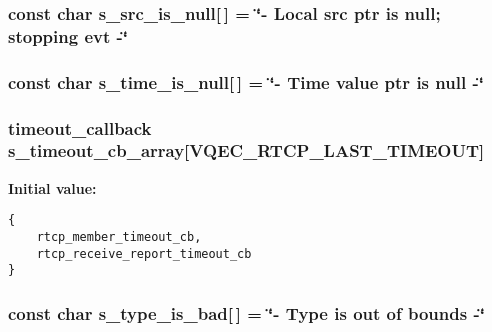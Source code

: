 \subsubsection{\setlength{\rightskip}{0pt plus 5cm}const char \bf{s\_\-src\_\-is\_\-null}[$\,$] = \char`\"{}- Local src ptr is null; stopping evt -\char`\"{}\hspace{0.3cm}{\tt  [static]}}\label{vqec__rtp_8c_ef2ddefa7c16210b376e11f459d68983}


\subsubsection{\setlength{\rightskip}{0pt plus 5cm}const char \bf{s\_\-time\_\-is\_\-null}[$\,$] = \char`\"{}- Time value ptr is null -\char`\"{}\hspace{0.3cm}{\tt  [static]}}\label{vqec__rtp_8c_af222c2bd6f541872b279c40294f18d4}


\subsubsection{\setlength{\rightskip}{0pt plus 5cm}\bf{timeout\_\-callback} \bf{s\_\-timeout\_\-cb\_\-array}[VQEC\_\-RTCP\_\-LAST\_\-TIMEOUT]\hspace{0.3cm}{\tt  [static]}}\label{vqec__rtp_8c_13c1ca9b4d82fedfc6ee5aa7f42d1e20}


\textbf{Initial value:}

\begin{Code}\begin{verbatim} 
{ 
    rtcp_member_timeout_cb,
    rtcp_receive_report_timeout_cb 
}
\end{verbatim}\end{Code}
\subsubsection{\setlength{\rightskip}{0pt plus 5cm}const char \bf{s\_\-type\_\-is\_\-bad}[$\,$] = \char`\"{}- Type is out of bounds -\char`\"{}\hspace{0.3cm}{\tt  [static]}}\label{vqec__rtp_8c_9392beebe82bbd0a551808bc07c1a973}


